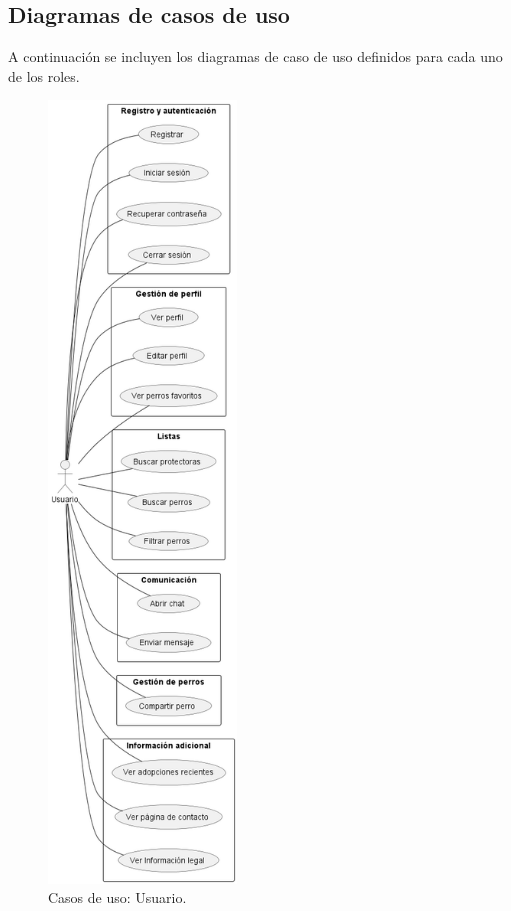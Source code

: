 \documentclass[a4paper, 12pt]{article}
\begin{document}
\subsection{Diagramas de casos de uso}

A continuación se incluyen los diagramas de caso de uso definidos para cada uno de los roles.

\begin{figure}[H]
	\begin{center}
		{\includegraphics[width=5cm]{diagram/UserC.png}\par}
		\caption{Casos de uso: Usuario.}
	\end{center}
\end{figure}
\end{document}
